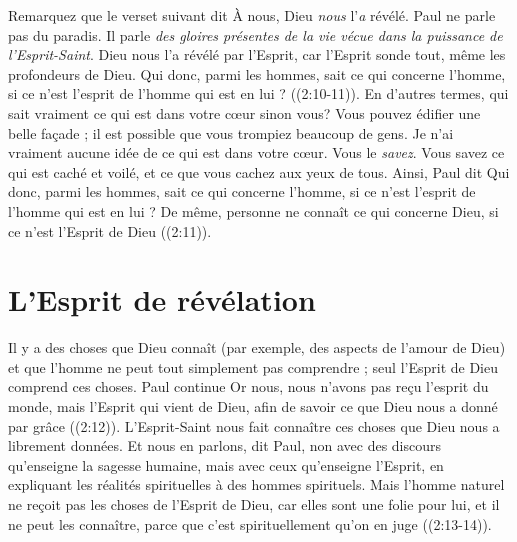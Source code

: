 Remarquez que le verset suivant dit\frcolon{}
 \Og À nous, Dieu \emph{nous} l'\emph{a} révélé. \Fg{}
 Paul ne parle pas du paradis.
 Il parle \emph{des gloires présentes de la vie vécue dans la puissance
 de l'Esprit-Saint}.
 \Og Dieu nous l'a révélé par l'Esprit, car l'Esprit sonde tout,
 même les profondeurs de Dieu. Qui donc, parmi les hommes,
 sait ce qui concerne l'homme, si ce n'est l'esprit de l'homme
 qui est en lui ? \Fg{} ((2:10-11)).
 En d'autres termes, qui sait vraiment ce qui est dans votre cœur sinon vous?
 Vous pouvez édifier une belle façade ; il est possible que vous trompiez
 beaucoup de gens.
 Je n'ai vraiment aucune idée de ce qui est dans votre cœur.
 Vous le \emph{savez}.
 Vous savez ce qui est caché et voilé, et ce que vous cachez aux yeux de tous.
 Ainsi, Paul dit\frcolon{}
 \Og Qui donc, parmi les hommes, sait ce qui concerne l'homme,
 si ce n'est l'esprit de l'homme qui est en lui ?
 De même, personne ne connaît ce qui concerne Dieu,
 si ce n'est l'Esprit de Dieu \Fg{} ((2:11)).


\section{L'Esprit de r\'ev\'elation}

Il y a des choses que Dieu connaît
 (par exemple, des aspects de l'amour de Dieu)
 et que l'homme ne peut tout simplement pas comprendre ;
 seul l'Esprit de Dieu comprend ces choses. Paul continue\frcolon{}
 \Og Or nous, nous n'avons pas reçu l'esprit du monde,
 mais l'Esprit qui vient de Dieu, afin de savoir ce que Dieu
 nous a donné par grâce \Fg{} ((2:12)).
 L'Esprit-Saint nous fait connaître ces choses que Dieu
 nous a librement données.
 \Og Et nous en parlons, dit Paul, non avec des discours qu'enseigne
 la sagesse humaine, mais avec ceux qu'enseigne l'Esprit,
 en expliquant les réalités spirituelles à des hommes spirituels.
 Mais l'homme naturel ne reçoit pas les choses de l'Esprit de Dieu,
 car elles sont une folie pour lui, et il ne peut les connaître,
 parce que c'est spirituellement qu'on en juge \Fg{}
 ((2:13-14)).

